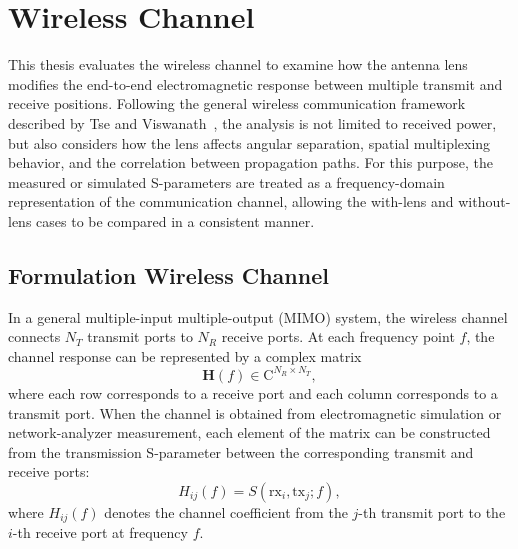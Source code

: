 \section{Wireless Channel}
This thesis evaluates the wireless channel to examine how the antenna lens modifies the end-to-end electromagnetic response between multiple transmit and receive positions. Following the general wireless communication framework described by Tse and Viswanath~\cite{Tse2005}, the analysis is not limited to received power, but also considers how the lens affects angular separation, spatial multiplexing behavior, and the correlation between propagation paths. For this purpose, the measured or simulated S-parameters are treated as a frequency-domain representation of the communication channel, allowing the with-lens and without-lens cases to be compared in a consistent manner.

\subsection{Formulation Wireless Channel}
In a general multiple-input multiple-output (MIMO) system, the wireless channel connects $N_T$ transmit ports to $N_R$ receive ports. At each frequency point $f$, the channel response can be represented by a complex matrix
\begin{equation}
    \mathbf{H}(f) \in \mathrm{C}^{N_R \times N_T},
\end{equation}
where each row corresponds to a receive port and each column corresponds to a transmit port. When the channel is obtained from electromagnetic simulation or network-analyzer measurement, each element of the matrix can be constructed from the transmission S-parameter between the corresponding transmit and receive ports:
\begin{equation}
    H_{ij}(f) = S(\mathrm{rx}_i,\mathrm{tx}_j;f),
\end{equation}
where $H_{ij}(f)$ denotes the channel coefficient from the $j$-th transmit port to the $i$-th receive port at frequency $f$.

